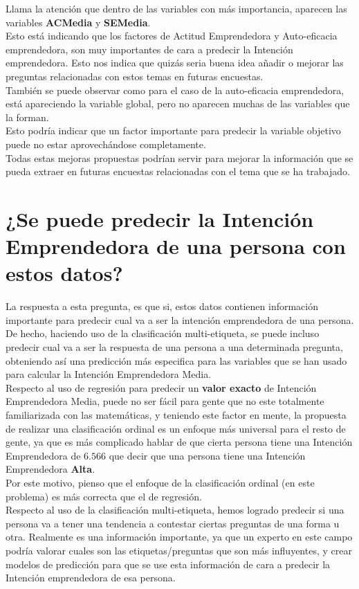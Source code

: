 \linebreak
Llama la atención que dentro de las variables con más importancia, aparecen las variables \textbf{ACMedia} y \textbf{SEMedia}. \\
Esto está indicando que los factores de Actitud Emprendedora y Auto-eficacia emprendedora, son muy importantes de cara a predecir la Intención emprendedora. Esto nos indica que quizás seria buena idea añadir o mejorar las preguntas relacionadas con estos temas en futuras encuestas. \\
También se puede observar como para el caso de la auto-eficacia emprendedora, está apareciendo la variable global, pero no aparecen muchas de las variables que la forman.\\
Esto podría indicar que un factor importante para predecir la variable objetivo puede no estar aprovechándose completamente.\\
\linebreak
Todas estas mejoras propuestas podrían servir para mejorar la información que se pueda extraer en futuras encuestas relacionadas con el tema que se ha trabajado.
\clearpage
\section{¿Se puede predecir la Intención Emprendedora de una persona con estos datos?}
La respuesta a esta pregunta, es que si, estos datos contienen información importante para predecir cual va a ser la intención emprendedora de una persona.\\
\linebreak
De hecho, haciendo uso de la clasificación multi-etiqueta, se puede incluso predecir cual va a ser la respuesta de una persona a una determinada pregunta, obteniendo así una predicción más especifica para las variables que se han usado para calcular la Intención Emprendedora Media.\\
\linebreak
Respecto al uso de regresión para predecir un \textbf{valor exacto }de Intención Emprendedora Media, puede no ser fácil para gente que no este totalmente familiarizada con las matemáticas, y teniendo este factor en mente, la propuesta de realizar una clasificación ordinal es un enfoque más universal para el resto de gente, ya que es más complicado hablar de que cierta persona tiene una Intención Emprendedora de $6.566$ que decir que una persona tiene una Intención Emprendedora \textbf{Alta}. \\
Por este motivo, pienso que el enfoque de la clasificación ordinal (en este problema) es más correcta que el de regresión.\\
\linebreak
Respecto al uso de la clasificación multi-etiqueta, hemos logrado predecir si una persona va a tener una tendencia a contestar ciertas preguntas de una forma u otra. Realmente es una información importante, ya que un experto en este campo podría valorar cuales son las etiquetas/preguntas que son más influyentes, y crear modelos de predicción para que se use esta información de cara a predecir la Intención emprendedora de esa persona.